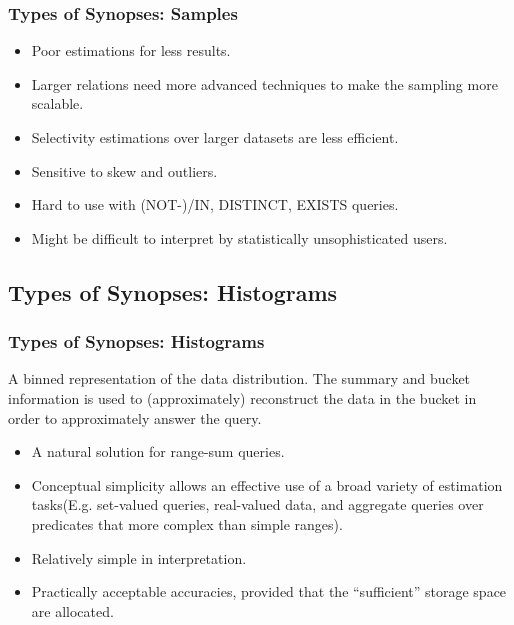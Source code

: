 \documentclass{beamer}
\begin{document}
\begin{frame}
\frametitle{Types of Synopses: Samples}
\begin{itemize}
\item{Poor estimations for less results.}
\item{Larger relations need more advanced techniques to make the sampling more scalable.}
\item{Selectivity estimations over larger datasets are less efficient.}
\item{Sensitive to skew and outliers.}
\item{Hard to use with (NOT-)/IN, DISTINCT, EXISTS queries.}
\item{Might be difficult to interpret by statistically unsophisticated users.}
\end{itemize}
\end{frame}

\subsection{Types of Synopses: Histograms}
\begin{frame}
\frametitle{Types of Synopses: Histograms}
A binned representation of the data distribution. The summary and bucket information is
used to (approximately) reconstruct the data in the bucket in order
to approximately answer the query.\pause
\vspace{0.2 cm}
\begin{itemize}
\item{A natural solution for range-sum queries.}
\item{Conceptual simplicity allows an effective use of a broad variety of estimation tasks(E.g. set-valued queries, real-valued data, and aggregate queries over predicates that more complex than simple ranges).}
\item{Relatively simple in interpretation.}
\item{Practically acceptable accuracies, provided that the “sufficient” storage space are allocated.}
\end{itemize}
\end{frame}
\end{document}
